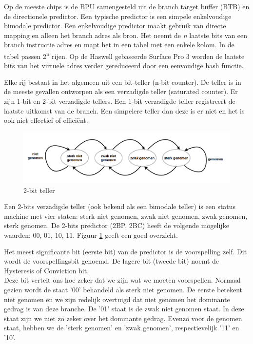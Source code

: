 Op de meeste chips is de BPU samengesteld uit de branch target buffer (BTB) en de directionele predictor.
Een typische predictor is een simpele enkelvoudige bimodale predictor.
Een enkelvoudige predictor maakt gebruik van directe mapping en alleen het branch adres als bron.
Het neemt de \emph{n} laatste bits van een branch instructie adres en mapt het in een tabel met een enkele kolom. In de tabel passen 2\textsuperscript{n} rijen.
Op de Haswell gebaseerde Surface Pro 3 worden de laatste bits van het virtuele adres
verder gereduceerd door een eenvoudige hash
functie.

Elke rij bestaat in het algemeen uit een bit-teller (n-bit counter).
De teller is in de meeste gevallen ontworpen als een verzadigde teller (saturated counter).
Er zijn 1-bit en 2-bit verzadigde tellers.
Een 1-bit verzadigde teller registreert de laatste uitkomst van de branch.
Een simpelere teller dan deze is er niet en het is ook niet effectief of efficiënt.


\begin{figure}
	\includegraphics[width=1.0\linewidth]{img/predictor.png}
	\caption{2-bit teller}
	\label{fig:predictor}
\end{figure}

Een 2-bits verzadigde teller (ook bekend als een bimodale teller) is een status machine met vier staten: sterk niet genomen, zwak niet genomen, zwak genomen, sterk genomen. \parencite{Lee2017}
De 2-bits predictor (2BP, 2BC) heeft de volgende mogelijke waarden: 00, 01, 10, 11. Figuur \ref{fig:predictor} geeft een goed overzicht.

Het meest significante bit (eerste bit) van de predictor is de voorspelling zelf.
Dit wordt de voorspellingsbit genoemd.
De lagere bit (tweede bit) noemt de Hysteresis of Conviction bit.\\
Deze bit vertelt ons hoe zeker dat we zijn wat we moeten voorspellen.
Normaal gezien wordt de staat '00' behandeld als sterk niet genomen.
De eerste betekent niet genomen en we zijn redelijk overtuigd dat niet genomen het dominante gedrag is van deze branche.
De '01' staat is de zwak niet genomen staat. In deze staat zijn we niet zo zeker over het dominante gedrag.
Evenzo voor de genomen staat, hebben we de 'sterk genomen' en 'zwak genomen', respectievelijk '11' en '10'.



